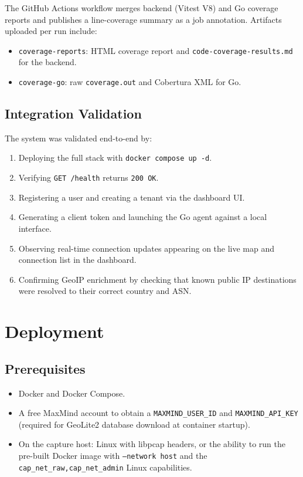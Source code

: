 \documentclass[12pt]{report}
\begin{document}
The GitHub Actions workflow merges backend (Vitest V8) and Go coverage reports and publishes
a line-coverage summary as a job annotation. Artifacts uploaded per run include:

\begin{itemize}
    \item \texttt{coverage-reports}: HTML coverage report and
          \texttt{code-coverage-results.md} for the backend.
    \item \texttt{coverage-go}: raw \texttt{coverage.out} and Cobertura XML for Go.
\end{itemize}

\section{Integration Validation}

The system was validated end-to-end by:

\begin{enumerate}
    \item Deploying the full stack with \texttt{docker compose up -d}.
    \item Verifying \texttt{GET /health} returns \texttt{200 OK}.
    \item Registering a user and creating a tenant via the dashboard UI.
    \item Generating a client token and launching the Go agent against a local interface.
    \item Observing real-time connection updates appearing on the live map and connection
          list in the dashboard.
    \item Confirming GeoIP enrichment by checking that known public IP destinations were
          resolved to their correct country and ASN.
\end{enumerate}

\chapter{Deployment}
\label{ch:deployment}

\section{Prerequisites}

\begin{itemize}
    \item Docker and Docker Compose.
    \item A free MaxMind account to obtain a \texttt{MAXMIND\_USER\_ID} and
          \texttt{MAXMIND\_API\_KEY} (required for GeoLite2 database download at container
          startup).
    \item On the capture host: Linux with  libpcap headers, or the ability to run the
          pre-built Docker image with \texttt{--network host} and the
          \texttt{cap\_net\_raw,cap\_net\_admin} Linux capabilities.
\end{itemize}
\end{document}
